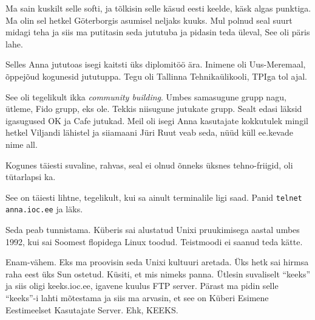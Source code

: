 Ma sain kuskilt selle softi, ja tõlkisin selle käsud eesti keelde, käsk algas punktiga. Ma olin sel hetkel Göterborgis asumisel neljaks kuuks. Mul polnud seal suurt midagi teha ja siis ma putitasin seda jututuba ja pidasin teda üleval, See oli päris lahe. 

Selles Anna jututoas isegi kaitsti üks diplomitöö ära. Inimene oli Uus-Meremaal,  õppejõud kogunesid jututuppa. Tegu oli  Tallinna Tehnikaülikooli,  TPIga tol ajal.


See oli tegelikult ikka \emph{community building}. Umbes samasugune grupp nagu, ütleme, Fido grupp, eks ole. Tekkis niisugune jutukate grupp. Sealt edasi läksid igasugused OK  ja Cafe jutukad. Meil oli isegi Anna  kasutajate kokkutulek mingil hetkel Viljandi lähistel ja siiamaani Jüri Ruut veab seda, nüüd küll ee.kevade nime all.

Kogunes täiesti suvaline, rahvas, seal ei olnud õnneks üksnes tehno-friigid, oli tütarlapsi ka. 


See on täiesti lihtne, tegelikult, kui sa ainult terminalile ligi saad. Panid \verb|telnet anna.ioc.ee| ja läks. 


Seda peab tunnistama. Küberis sai alustatud Unixi pruukimisega aastal umbes 1992, kui sai Soomest flopidega Linux toodud. Teistmoodi ei saanud teda kätte. 


Enam-vähem.  Eks ma proovisin seda Unixi kultuuri aretada. Üks hetk sai hirmsa raha eest üks  Sun ostetud. Küsiti, et mis  nimeks panna. Ütlesin suvaliselt \enquote{keeks} ja siis oligi keeks.ioc.ee, igavene kuulus FTP server. Pärast ma pidin selle \enquote{keeks}-i lahti mõtestama ja siis ma arvasin, et see on Küberi Esimene Eestimeelset Kasutajate Server. Ehk, KEEKS.

